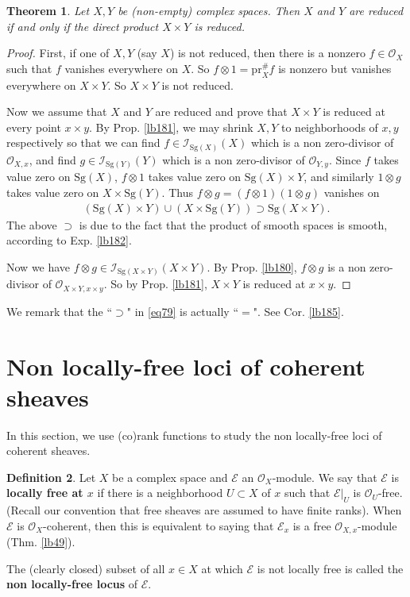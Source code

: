 \documentclass[12pt,b5paper,notitlepage]{report}
\theoremstyle{definition}
\newtheorem{df}{Definition}[section]
\theoremstyle{plain}
\newtheorem{thm}[df]{Theorem}
\newcommand{\scr}{\mathscr}
\newcommand{\pr}{\mathrm {pr}}
\newcommand{\Sg}{\mathrm{Sg}}
\numberwithin{equation}{section}
\begin{document}
\begin{thm}\label{lb367}
Let $X,Y$ be (non-empty) complex spaces. Then $X$ and $Y$ are reduced if and only if the direct product $X\times Y$ is reduced.
\end{thm}

\begin{proof}
First, if one of $X,Y$ (say $X$) is not reduced, then there is a nonzero $f\in\scr O_X$ such that $f$ vanishes everywhere on $X$. So $f\otimes 1=\pr_X^\#f$ is nonzero but vanishes everywhere on $X\times Y$. So $X\times Y$ is not reduced.

Now we assume that $X$ and $Y$ are reduced and prove that $X\times Y$ is reduced at every point $x\times y$. By Prop. \ref{lb181}, we may shrink $X,Y$ to  neighborhoods of $x,y$ respectively so that we can find $f\in\scr I_{\Sg(X)}(X)$ which is a non zero-divisor of $\scr O_{X,x}$, and find $g\in\scr I_{\Sg(Y)}(Y)$ which is a non zero-divisor of $\scr O_{Y,y}$. Since $f$ takes value zero on $\Sg(X)$, $f\otimes 1$ takes value zero on $\Sg(X)\times Y$, and similarly $1\otimes g$ takes value zero on $X\times\Sg(Y)$. Thus $f\otimes g=(f\otimes 1)(1\otimes g)$ vanishes on
\begin{align}
(\Sg(X)\times Y)\cup (X\times\Sg(Y))\supset \Sg(X\times Y).\label{eq79}
\end{align}
The above $\supset$ is due to the fact that the product of smooth spaces is smooth, according to Exp. \ref{lb182}. 

Now we have $f\otimes g\in\scr I_{\Sg(X\times Y)}(X\times Y)$. By Prop. \ref{lb180}, $f\otimes g$ is a non zero-divisor of $\scr O_{X\times Y,x\times y}$. So by Prop. \ref{lb181}, $X\times Y$ is reduced at $x\times y$.
\end{proof}

We remark that the ``$\supset$" in \eqref{eq79} is actually ``$=$". See Cor. \ref{lb185}.








\section{Non locally-free loci of coherent sheaves}


In this section, we use (co)rank functions to study the non locally-free loci of coherent sheaves.

\begin{df}
Let $X$ be a complex space and $\scr E$ an $\scr O_X$-module. We say that $\scr E$ is \textbf{locally free at $x$}  if there is a neighborhood $U\subset X$ of $x$ such that $\scr E|_U$ is $\scr O_U$-free. (Recall our convention that free sheaves are assumed to have finite ranks). When $\scr E$ is $\scr O_X$-coherent, then this is equivalent to saying that $\scr E_x$ is a free $\scr O_{X,x}$-module (Thm. \ref{lb49}).

The (clearly closed) subset of all $x\in X$ at which $\scr E$ is not locally free is called the \textbf{non locally-free locus} of $\scr E$.    \hfill\qedsymbol
\end{df}
\end{document}
